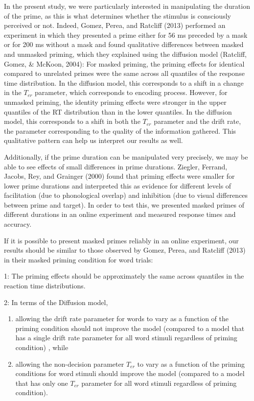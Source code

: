 \documentclass[
  english,
  man]{apa6}
\begin{document}
In the present study, we were particularly interested in manipulating the duration of the prime, as this is what determines whether the stimulus is consciously perceived or not. Indeed, Gomez, Perea, and Ratcliff (2013) performed an experiment in which they presented a prime either for 56 ms preceded by a mask or for 200 ms without a mask and found qualitative differences between masked and unmasked priming, which they explained using the diffusion model (Ratcliff, Gomez, \& McKoon, 2004): For masked priming, the priming effects for identical compared to unrelated primes were the same across all quantiles of the response time distribution. In the diffusion model, this corresponds to a shift in a change in the \(T_{er}\) parameter, which corresponds to encoding process. However, for unmasked priming, the identity priming effects were stronger in the upper quantiles of the RT distribution than in the lower quantiles. In the diffusion model, this corresponds to a shift in both the \(T_{er}\) parameter and the drift rate, the parameter corresponding to the quality of the information gathered. This qualitative pattern can help us interpret our results as well.

Additionally, if the prime duration can be manipulated very precisely, we may be able to see effects of small differences in prime durations. Ziegler, Ferrand, Jacobs, Rey, and Grainger (2000) found that priming effects were smaller for lower prime durations and interpreted this as evidence for different levels of facilitation (due to phonological overlap) and inhibition (due to visual differences between prime and target). In order to test this, we presented masked primes of different durations in an online experiment and measured response times and accuracy.

If it is possible to present masked primes reliably in an online experiment, our results should be similar to those observed by Gomez, Perea, and Ratcliff (2013) in their masked priming condition for word trials:

1: The priming effects should be approximately the same across quantiles in the reaction time distributions.

2: In terms of the Diffusion model,

\begin{enumerate}
\def\labelenumi{\alph{enumi})}
\item
  allowing the drift rate parameter for words to vary as a function of the priming condition should not improve the model (compared to a model that has a single drift rate parameter for all word stimuli regardless of priming condition) , while
\item
  allowing the non-decision parameter \(T_{er}\) to vary as a function of the priming conditions for word stimuli should improve the model (compared to a model that has only one \(T_{er}\) parameter for all word stimuli regardless of priming condition).
\end{enumerate}
\end{document}
